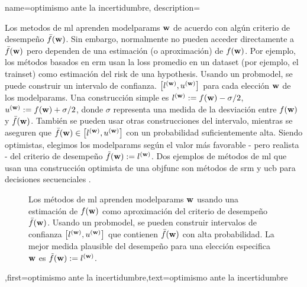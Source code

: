 {name={optimismo ante la incertidumbre},
	description={Los metodos de \gls{ml} aprenden \gls{modelparams} ${\bf w}$ 
		de acuerdo con algún criterio de desempeño $\bar{f}({\bf w})$. Sin embargo, normalmente 
		no pueden acceder directamente a $\bar{f}({\bf w})$  pero dependen de una estimación (o aproximación) de $f({\bf w})$. 
		Por ejemplo, los métodos basados en \gls{erm} usan la \gls{loss} promedio en un \gls{dataset} (por ejemplo, el \gls{trainset}) 
		como estimación del \gls{risk} de una \gls{hypothesis}. Usando un \gls{probmodel}, se puede construir 
		un intervalo  de confianza. 
	$\big[ l^{({\bf w})},  u^{({\bf w})} \big]$ para cada elección ${\bf w}$ de los \gls{modelparams}.
	Una construcción simple es $l^{({\bf w})} := f({\bf w}) - \sigma/2$, $u^{({\bf w})} := f({\bf w})+ \sigma/2$, 
	donde $\sigma$ representa una medida de la desviación entre $f({\bf w})$ y $\bar{f}({\bf w})$. 
	También se pueden usar otras construcciones del intervalo, mientras se aseguren que $\bar{f}({\bf w}) \in\big[ l^{({\bf w})},  u^{({\bf w})} \big]$ 
	con un probabilidad suficientemente alta. Siendo optimistas, elegimos los \gls{modelparams} 
	según el valor más favorable - pero realista - del criterio de desempeño $\tilde{f}({\bf w}) :=  l^{({\bf w})}$. 
	Dos ejemplos de métodos de \gls{ml} que usan una construcción optimista de una \gls{objfunc} 
	son métodos de \gls{srm} \cite[Ch. 11]{ShalevMLBook} y \gls{ucb}  para decisiones secuenciales \cite[Sec. 2.2]{Bubeck2012}. 
		\begin{figure}[H]
				\begin{center}
\caption{Los métodos de \gls{ml} aprenden \gls{modelparams} ${\bf w}$ usando una estimación de $f({\bf w})$ como 
	aproximación del criterio de desempeño $\bar{f}({\bf w})$. Usando un \gls{probmodel}, se pueden construir intervalos de confianza $\big[ l^{({\bf w})},  u^{({\bf w})} \big]$ 
	que contienen $\bar{f}({\bf w})$ con alta probabilidad. La mejor medida plausible del desempeño para una elección especifica ${\bf w}$ es $\tilde{f}({\bf w}) := l^{({\bf w})}$.} 
	\end{center}
		\end{figure}},first={optimismo ante la incertidumbre},text={optimismo ante la incertidumbre} 
}

